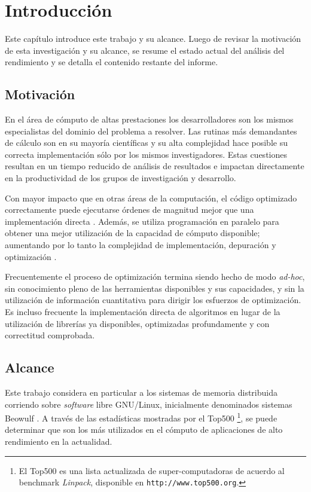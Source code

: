 \documentclass[a4paper]{report}
\begin{document}
\chapter{Introducción}\label{chap:intro}

Este capítulo introduce este trabajo y su alcance. Luego de revisar la motivación de esta investigación y su alcance, se resume el estado actual del análisis
del rendimiento y se detalla el contenido restante del informe.

\section{Motivación}

En el área de cómputo de altas prestaciones los desarrolladores son los mismos
especialistas del dominio del problema a resolver. Las rutinas
más demandantes de cálculo son en su mayoría científicas y su
alta complejidad hace posible su correcta implementación sólo por los mismos investigadores.
Estas cuestiones resultan en un tiempo reducido de análisis de resultados
e impactan directamente en la productividad de los grupos de investigación y
desarrollo.

\bigskip

Con mayor impacto que en otras áreas de la computación, el código
optimizado correctamente puede ejecutarse órdenes de magnitud mejor que una implementación
directa \cite{mm-tool}. Además, se utiliza
programación en paralelo para obtener una mejor utilización de la
capacidad de cómputo disponible; aumentando por lo tanto la complejidad de
implementación, depuración y optimización \cite{is-parallel-programming-hard}.

\bigskip

Frecuentemente el proceso de optimización termina siendo
hecho de modo {\it ad-hoc}, sin conocimiento pleno de las herramientas disponibles y
sus capacidades, y sin la utilización de información cuantitativa para dirigir los
esfuerzos de optimización. Es incluso frecuente la implementación directa
de algoritmos en lugar de la utilización de librerías ya disponibles, optimizadas
profundamente y con correctitud comprobada.

\section{Alcance}

Este trabajo considera en particular a los sistemas de memoria distribuida corriendo sobre
{\it software} libre GNU/Linux, inicialmente denominados sistemas Beowulf \cite{beowulf-parallel-workstation}. A través de las
estadísticas mostradas por el Top500 \footnote{El Top500 es una lista actualizada de super-computadoras
de acuerdo al benchmark {\it Linpack}, disponible en {\tt http://www.top500.org}.}, se
puede determinar que son los más utilizados en el cómputo de aplicaciones de alto rendimiento en la actualidad.
\end{document}
